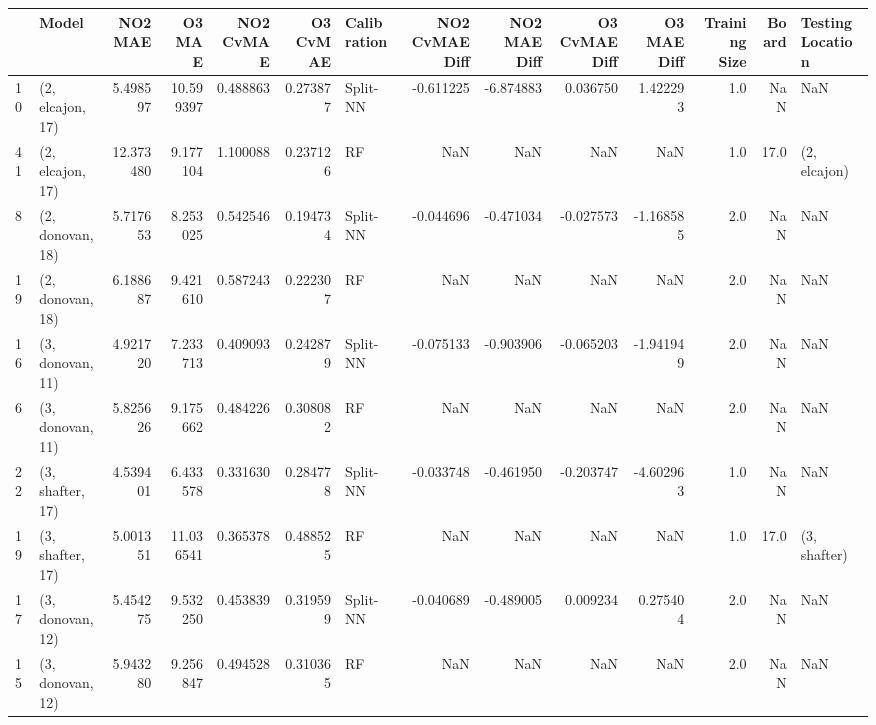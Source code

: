 \begin{tabular}{llrrrrlrrrrrrl}
\toprule
{} &             Model &    NO2 MAE &     O3 MAE &  NO2 CvMAE &  O3 CvMAE & Calibration &  NO2 CvMAE Diff &  NO2 MAE Diff &  O3 CvMAE Diff &  O3 MAE Diff &  Training Size &  Board & Testing Location \\
\midrule
10 &  (2, elcajon, 17) &   5.498597 &  10.599397 &   0.488863 &  0.273877 &    Split-NN &       -0.611225 &     -6.874883 &       0.036750 &     1.422293 &            1.0 &    NaN &              NaN \\
41 &  (2, elcajon, 17) &  12.373480 &   9.177104 &   1.100088 &  0.237126 &          RF &             NaN &           NaN &            NaN &          NaN &            1.0 &   17.0 &     (2, elcajon) \\
8  &  (2, donovan, 18) &   5.717653 &   8.253025 &   0.542546 &  0.194734 &    Split-NN &       -0.044696 &     -0.471034 &      -0.027573 &    -1.168585 &            2.0 &    NaN &              NaN \\
19 &  (2, donovan, 18) &   6.188687 &   9.421610 &   0.587243 &  0.222307 &          RF &             NaN &           NaN &            NaN &          NaN &            2.0 &    NaN &              NaN \\
16 &  (3, donovan, 11) &   4.921720 &   7.233713 &   0.409093 &  0.242879 &    Split-NN &       -0.075133 &     -0.903906 &      -0.065203 &    -1.941949 &            2.0 &    NaN &              NaN \\
6  &  (3, donovan, 11) &   5.825626 &   9.175662 &   0.484226 &  0.308082 &          RF &             NaN &           NaN &            NaN &          NaN &            2.0 &    NaN &              NaN \\
22 &  (3, shafter, 17) &   4.539401 &   6.433578 &   0.331630 &  0.284778 &    Split-NN &       -0.033748 &     -0.461950 &      -0.203747 &    -4.602963 &            1.0 &    NaN &              NaN \\
19 &  (3, shafter, 17) &   5.001351 &  11.036541 &   0.365378 &  0.488525 &          RF &             NaN &           NaN &            NaN &          NaN &            1.0 &   17.0 &     (3, shafter) \\
17 &  (3, donovan, 12) &   5.454275 &   9.532250 &   0.453839 &  0.319599 &    Split-NN &       -0.040689 &     -0.489005 &       0.009234 &     0.275404 &            2.0 &    NaN &              NaN \\
15 &  (3, donovan, 12) &   5.943280 &   9.256847 &   0.494528 &  0.310365 &          RF &             NaN &           NaN &            NaN &          NaN &            2.0 &    NaN &              NaN \\

\end{tabular}
